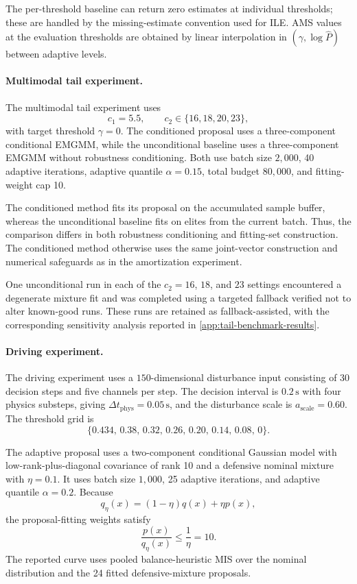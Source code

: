 The per-threshold baseline can return zero estimates at individual thresholds; these are handled by the missing-estimate convention used for ILE. AMS values at the evaluation thresholds are obtained by linear interpolation in $(\gamma,\log\widehat P)$ between adaptive levels.

\paragraph{Multimodal tail experiment.}
The multimodal tail experiment uses
\[
    c_1=5.5,
    \qquad
    c_2\in\{16,18,20,23\},
\]
with target threshold $\gamma=0$. The conditioned proposal uses a three-component conditional EMGMM, while the unconditional baseline uses a three-component EMGMM without robustness conditioning. Both use batch size $2{,}000$, 40 adaptive iterations, adaptive quantile $\alpha=0.15$, total budget $80{,}000$, and fitting-weight cap 10.

The conditioned method fits its proposal on the accumulated sample buffer, whereas the unconditional baseline fits on elites from the current batch. Thus, the comparison differs in both robustness conditioning and fitting-set construction. The conditioned method otherwise uses the same joint-vector construction and numerical safeguards as in the amortization experiment.

One unconditional run in each of the $c_2=16$, $18$, and $23$ settings encountered a degenerate mixture fit and was completed using a targeted fallback verified not to alter known-good runs. These runs are retained as fallback-assisted, with the corresponding sensitivity analysis reported in \cref{app:tail-benchmark-results}.

\paragraph{Driving experiment.}
The driving experiment uses a $150$-dimensional disturbance input consisting of 30 decision steps and five channels per step. The decision interval is $0.2\,\mathrm{s}$ with four physics substeps, giving $\Delta t_{\mathrm{phys}}=0.05\,\mathrm{s}$, and the disturbance scale is $a_{\mathrm{scale}}=0.60$. The threshold grid is
\[
    \{0.434,\,0.38,\,0.32,\,0.26,\,0.20,\,0.14,\,0.08,\,0\}.
\]

The adaptive proposal uses a two-component conditional Gaussian model with low-rank-plus-diagonal covariance of rank 10 and a defensive nominal mixture with $\eta=0.1$. It uses batch size $1{,}000$, 25 adaptive iterations, and adaptive quantile $\alpha=0.2$. Because
\[
    q_\eta(x)
    =
    (1-\eta)q(x)+\eta p(x),
\]
the proposal-fitting weights satisfy
\[
    \frac{p(x)}{q_\eta(x)}
    \leq
    \frac{1}{\eta}
    =
    10.
\]
The reported curve uses pooled balance-heuristic MIS over the nominal distribution and the 24 fitted defensive-mixture proposals.

